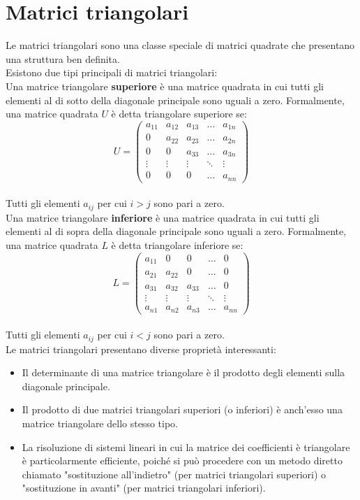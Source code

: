 \section{Matrici triangolari}
Le matrici triangolari sono una classe speciale di matrici quadrate
che presentano una struttura ben definita.
\leavevmode\\
Esistono due tipi principali di matrici triangolari:
\leavevmode\\
Una matrice triangolare \textbf{superiore} è una matrice quadrata in
cui tutti gli elementi al di sotto della diagonale principale sono
uguali a zero. Formalmente, una matrice quadrata \( U \) è detta
triangolare superiore se:
\leavevmode\\
\[
  U =
  \begin{pmatrix}
    a_{11} & a_{12} & a_{13} & \dots & a_{1n} \\
    0 & a_{22} & a_{23} & \dots & a_{2n} \\
    0 & 0 & a_{33} & \dots & a_{3n} \\
    \vdots & \vdots & \vdots & \ddots & \vdots \\
    0 & 0 & 0 & \dots & a_{nn}
  \end{pmatrix}
\]
\leavevmode\\
Tutti gli elementi \( a_{ij} \) per cui \( i > j \) sono pari a zero.
\leavevmode\\
Una matrice triangolare \textbf{inferiore} è una matrice quadrata in
cui tutti gli elementi al di sopra della diagonale principale sono
uguali a zero. Formalmente, una matrice quadrata \( L \) è detta
triangolare inferiore se:
\leavevmode\\
\[
  L =
  \begin{pmatrix}
    a_{11} & 0 & 0 & \dots & 0 \\
    a_{21} & a_{22} & 0 & \dots & 0 \\
    a_{31} & a_{32} & a_{33} & \dots & 0 \\
    \vdots & \vdots & \vdots & \ddots & \vdots \\
    a_{n1} & a_{n2} & a_{n3} & \dots & a_{nn}
  \end{pmatrix}
\]
\leavevmode\\
Tutti gli elementi \( a_{ij} \) per cui \( i < j \) sono pari a zero.
\leavevmode\\
Le matrici triangolari presentano diverse proprietà interessanti:
\begin{itemize}
  \item Il determinante di una matrice triangolare è il prodotto
    degli elementi sulla diagonale principale.
  \item Il prodotto di due matrici triangolari superiori (o
    inferiori) è anch'esso una matrice triangolare dello stesso tipo.
  \item La risoluzione di sistemi lineari in cui la matrice dei
    coefficienti è triangolare è particolarmente efficiente, poiché
    si può procedere con un metodo diretto chiamato "sostituzione
    all'indietro" (per matrici triangolari superiori) o "sostituzione
    in avanti" (per matrici triangolari inferiori).
\end{itemize}
